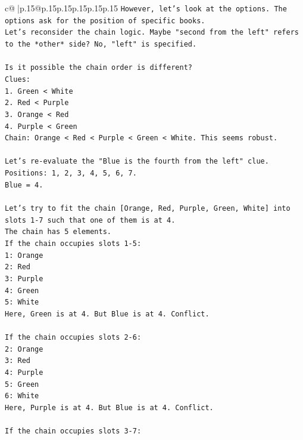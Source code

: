 \documentclass{article}
\begin{document}
{\begin{supertabular}{c@{$\;$}|p{.15\linewidth}@{}p{.15\linewidth}p{.15\linewidth}p{.15\linewidth}p{.15\linewidth}p{.15\linewidth}}
{{{\texttt{However, let's look at the options. The options ask for the position of specific books.} \\
\texttt{Let's reconsider the chain logic. Maybe "second from the left" refers to the *other* side? No, "left" is specified.} \\
\\ 
\texttt{Is it possible the chain order is different?} \\
\texttt{Clues:} \\
\texttt{1. Green < White} \\
\texttt{2. Red < Purple} \\
\texttt{3. Orange < Red} \\
\texttt{4. Purple < Green} \\
\texttt{Chain: Orange < Red < Purple < Green < White. This seems robust.} \\
\\ 
\texttt{Let's re{-}evaluate the "Blue is the fourth from the left" clue.} \\
\texttt{Positions: 1, 2, 3, 4, 5, 6, 7.} \\
\texttt{Blue = 4.} \\
\\ 
\texttt{Let's try to fit the chain {[}Orange, Red, Purple, Green, White{]} into slots 1{-}7 such that one of them is at 4.} \\
\texttt{The chain has 5 elements.} \\
\texttt{If the chain occupies slots 1{-}5:} \\
\texttt{1: Orange} \\
\texttt{2: Red} \\
\texttt{3: Purple} \\
\texttt{4: Green} \\
\texttt{5: White} \\
\texttt{Here, Green is at 4. But Blue is at 4. Conflict.} \\
\\ 
\texttt{If the chain occupies slots 2{-}6:} \\
\texttt{2: Orange} \\
\texttt{3: Red} \\
\texttt{4: Purple} \\
\texttt{5: Green} \\
\texttt{6: White} \\
\texttt{Here, Purple is at 4. But Blue is at 4. Conflict.} \\
\\ 
\texttt{If the chain occupies slots 3{-}7:} \\
}}}
\end{supertabular}}
\end{document}
